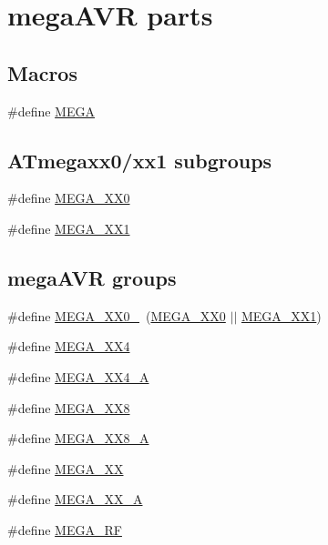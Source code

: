 \hypertarget{group__mega__part__macros__group}{\section{mega\-A\-V\-R parts}
\label{group__mega__part__macros__group}
}
\subsection*{Macros}
\begin{DoxyCompactItemize}
\item 
\#define \hyperlink{group__mega__part__macros__group_ga78a6115b485de47c7cc56b224c558ea2}{M\-E\-G\-A}
\end{DoxyCompactItemize}
\subsection*{A\-Tmegaxx0/xx1 subgroups}
\begin{DoxyCompactItemize}
\item 
\#define \hyperlink{group__mega__part__macros__group_gad59dc6f3c3dc91c94cd1673448135b83}{M\-E\-G\-A\-\_\-\-X\-X0}
\item 
\#define \hyperlink{group__mega__part__macros__group_ga9ed7e955cff24655d99517f91d9f6392}{M\-E\-G\-A\-\_\-\-X\-X1}
\end{DoxyCompactItemize}
\subsection*{mega\-A\-V\-R groups}
\begin{DoxyCompactItemize}
\item 
\#define \hyperlink{group__mega__part__macros__group_ga59ba73abcf65d3d398e7d37d78c271fe}{M\-E\-G\-A\-\_\-\-X\-X0\-\_}~(\hyperlink{group__mega__part__macros__group_gad59dc6f3c3dc91c94cd1673448135b83}{M\-E\-G\-A\-\_\-\-X\-X0} $|$$|$ \hyperlink{group__mega__part__macros__group_ga9ed7e955cff24655d99517f91d9f6392}{M\-E\-G\-A\-\_\-\-X\-X1})
\item 
\#define \hyperlink{group__mega__part__macros__group_gadcf5297df4d3d2f2bb5ccd7d6e3578b6}{M\-E\-G\-A\-\_\-\-X\-X4}
\item 
\#define \hyperlink{group__mega__part__macros__group_gaf7dde20cbd5a8e5d53438e8dfac074a2}{M\-E\-G\-A\-\_\-\-X\-X4\-\_\-\-A}
\item 
\#define \hyperlink{group__mega__part__macros__group_ga47583caa82990781cd23a8495710ef31}{M\-E\-G\-A\-\_\-\-X\-X8}
\item 
\#define \hyperlink{group__mega__part__macros__group_gadb4a50447f658e564b640ca248e85b51}{M\-E\-G\-A\-\_\-\-X\-X8\-\_\-\-A}
\item 
\#define \hyperlink{group__mega__part__macros__group_gabdf992a84b61d19055315a473c2e0f20}{M\-E\-G\-A\-\_\-\-X\-X}
\item 
\#define \hyperlink{group__mega__part__macros__group_ga2b23bf35c1439ec05ddac769a8d8d1f8}{M\-E\-G\-A\-\_\-\-X\-X\-\_\-\-A}
\item 
\#define \hyperlink{group__mega__part__macros__group_ga1d762b037d9532cdfbc28404113aa480}{M\-E\-G\-A\-\_\-\-R\-F}
\end{DoxyCompactItemize}
